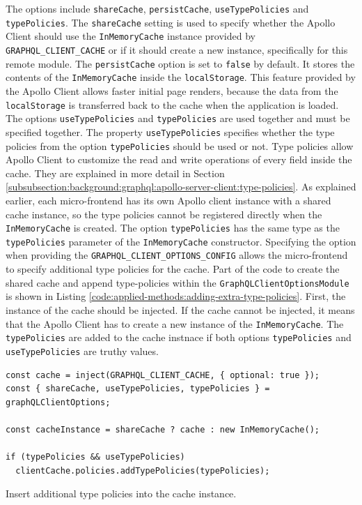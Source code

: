 \noindent The options include \texttt{shareCache}, \texttt{persistCache}, \texttt{useTypePolicies} and \texttt{typePolicies}. The \texttt{shareCache} setting is used to specify whether the Apollo Client should use the \texttt{InMemoryCache} instance provided by \texttt{GRAPHQL\_CLIENT\_CACHE} or if it should create a new instance, specifically for this remote module. The \texttt{persistCache} option is set to \texttt{false} by default. It stores the contents of the \texttt{InMemoryCache} inside the \texttt{localStorage}. This feature provided by the Apollo Client allows faster initial page renders, because the data from the \texttt{localStorage} is transferred back to the cache when the application is loaded. The options \texttt{useTypePolicies} and \texttt{typePolicies} are used together and must be specified together. The property \texttt{useTypePolicies} specifies whether the type policies from the option \texttt{typePolicies} should be used or not. Type policies allow Apollo Client to customize the read and write operations of every field inside the cache. They are explained in more detail in Section \ref{subsubsection:background:graphql:apollo-server-client:type-policies}. As explained earlier, each micro-frontend has its own Apollo client instance with a shared cache instance, so the type policies cannot be registered directly when the \texttt{InMemoryCache} is created. The option \texttt{typePolicies} has the same type as the \texttt{typePolicies} parameter of the \texttt{InMemoryCache} constructor. Specifying the option when providing the \texttt{GRAPHQL\_CLIENT\_OPTIONS\_CONFIG} allows the micro-frontend to specify additional type policies for the cache. Part of the code to create the shared cache and append type-policies within the \texttt{GraphQLClientOptionsModule} is shown in Listing \ref{code:applied-methods:adding-extra-type-policies}. First, the instance of the cache should be injected. If the cache cannot be injected, it means that the Apollo Client has to create a new instance of the \texttt{InMemoryCache}. The \texttt{typePolicies} are added to the cache instnace if both options \texttt{typePolicies} and \texttt{useTypePolicies} are truthy values.

\ifshowListings
\begin{listing}[H]
\begin{verbatim}
const cache = inject(GRAPHQL_CLIENT_CACHE, { optional: true });
const { shareCache, useTypePolicies, typePolicies } = graphQLClientOptions;

const cacheInstance = shareCache ? cache : new InMemoryCache();

if (typePolicies && useTypePolicies)
  clientCache.policies.addTypePolicies(typePolicies);
\end{verbatim}
\caption{Insert additional type policies into the cache instance.}\label{code:applied-methods:adding-extra-type-policies}
\end{listing}
\fi
